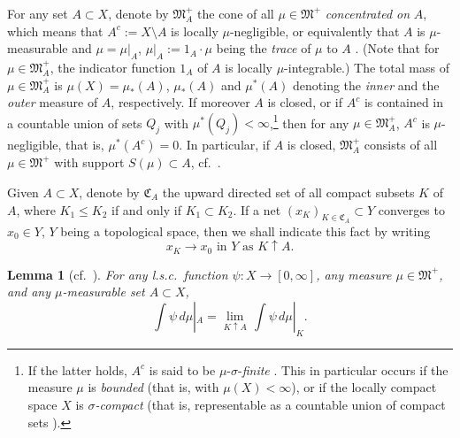 \documentclass[12pt,a4paper,reqno]{amsart} %
\theoremstyle{lause}
\theoremstyle{maaritelma}
\theoremstyle{lause}
\newtheorem{lemma}[theorem]{Lemma}
\theoremstyle{maaritelma}
\numberwithin{equation}{section}
\begin{document}
For any set $A\subset X$, denote by $\mathfrak M^+_A$ the cone of all $\mu\in\mathfrak M^+$ {\it concentrated on\/}
$A$, which means that $A^c:=X\setminus A$ is locally $\mu$-neg\-lig\-ible, or equivalently that $A$ is $\mu$-meas\-ur\-able and $\mu=\mu|_A$, $\mu|_A:=1_A\cdot\mu$ being the {\it trace\/} of $\mu$ to $A$ \cite[Section~IV.14.7]{E2}. (Note that for $\mu\in\mathfrak M^+_A$, the indicator function $1_A$ of $A$ is locally $\mu$-int\-egr\-able.) The total mass of $\mu\in\mathfrak M^+_A$ is $\mu(X)=\mu_*(A)$, $\mu_*(A)$ and $\mu^*(A)$ denoting the {\it inner\/} and the {\it outer\/} measure of $A$, respectively. If moreover $A$ is closed, or if $A^c$ is contained in a countable union of sets $Q_j$ with $\mu^*(Q_j)<\infty$,\footnote{If the latter holds, $A^c$ is said to be $\mu$-$\sigma$-{\it finite\/} \cite[Section~IV.7.3]{E2}. This in particular occurs if the measure $\mu$ is {\it bounded\/} (that is, with $\mu(X)<\infty$), or if the locally compact space $X$ is {\it $\sigma$-com\-pact\/} (that is, representable as a countable union of compact sets \cite[Section~I.9, Definition~5]{B1}).} then for any $\mu\in\mathfrak M^+_A$, $A^c$ is $\mu$-neg\-lig\-ible, that is, $\mu^*(A^c)=0$. In particular, if $A$ is closed, $\mathfrak M^+_A$ consists of all $\mu\in\mathfrak M^+$ with support $S(\mu)\subset A$, cf.\ \cite[Section~III.2.2]{B2}.

Given $A\subset X$, denote by $\mathfrak C_A$ the upward directed set of all compact subsets $K$ of $A$, where $K_1\leqslant K_2$ if and only if $K_1\subset K_2$. If a net $(x_K)_{K\in\mathfrak C_A}\subset Y$ converges to $x_0\in Y$, $Y$ being a topological space, then we shall indicate this fact by writing
\begin{equation*}\label{abr}x_K\to x_0\text{ \ in $Y$ as $K\uparrow A$}.\end{equation*}

\begin{lemma}[{\rm cf.\ \cite[Lemma~1.2.2]{F1}}]\label{l-lower}For any l.s.c.\ function\/ $\psi:X\to[0,\infty]$, any measure\/ $\mu\in\mathfrak M^+$, and any\/ $\mu$-measurable set\/ $A\subset X$,
\[\int\psi\,d\mu|_A=\lim_{K\uparrow A}\,\int\psi\,d\mu|_K.\]
\end{lemma}
\end{document}
